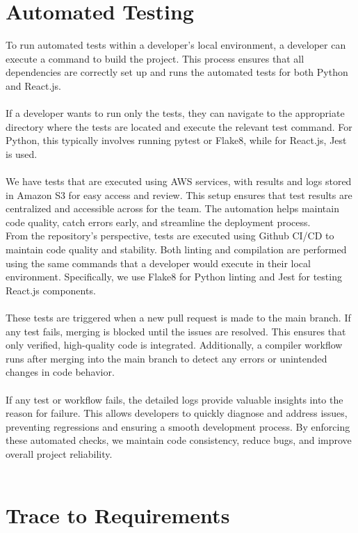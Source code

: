 \documentclass[12pt, titlepage]{article}
\begin{document}
\section{Automated Testing}
To run automated tests within a developer’s local environment, a developer can execute a command to build the project. This process ensures that all dependencies are correctly set up and runs the automated tests for both Python and React.js.\\\\
If a developer wants to run only the tests, they can navigate to the appropriate directory where the tests are located and execute the relevant test command. For Python, this typically involves running pytest or Flake8, while for React.js, Jest is used.\\\\
We have tests that are executed using AWS services, with results and logs stored in Amazon S3 for easy access and review. This setup ensures that test results are centralized and accessible across for the team. The automation helps maintain code quality, catch errors early, and streamline the deployment process.\\
From the repository’s perspective, tests are executed using Github CI/CD to maintain code quality and stability. Both linting and compilation are performed using the same commands that a developer would execute in their local environment. Specifically, we use Flake8 for Python linting and Jest for testing React.js components.\\\\
These tests are triggered when a new pull request is made to the main branch. If any test fails, merging is blocked until the issues are resolved. This ensures that only verified, high-quality code is integrated. Additionally, a compiler workflow runs after merging into the main branch to detect any errors or unintended changes in code behavior.\\\\
If any test or workflow fails, the detailed logs provide valuable insights into the reason for failure. This allows developers to quickly diagnose and address issues, preventing regressions and ensuring a smooth development process. By enforcing these automated checks, we maintain code consistency, reduce bugs, and improve overall project reliability.\\\\
\section{Trace to Requirements}
		
\end{document}
